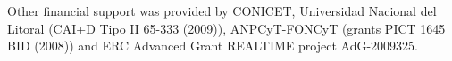 \documentclass[review]{elsarticle}
\begin{document}
Other financial support was provided by CONICET, Universidad Nacional del Litoral (CAI+D Tipo II 65-333 (2009)), ANPCyT-FONCyT (grants PICT 1645 BID (2008)) and ERC Advanced Grant REALTIME project AdG-2009325.





%
%
%
%
\end{document}
